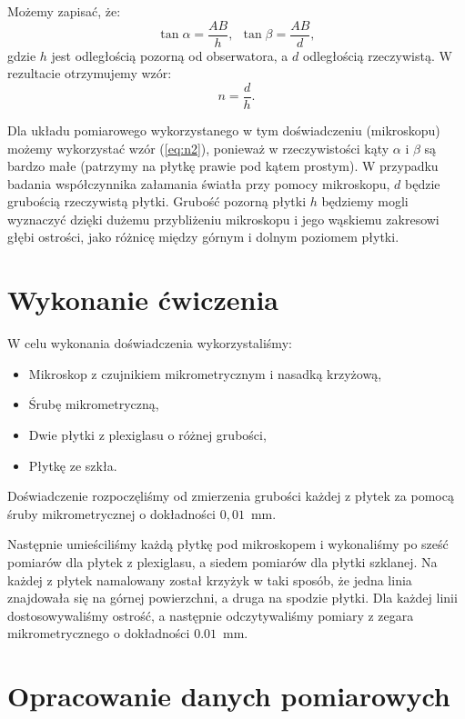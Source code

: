 \documentclass[12pt,a4paper]{article}
\numberwithin{equation}{section}
\begin{document}
Możemy zapisać, że:
\begin{equation}
	\tan \alpha = \frac{AB}{h},~~\tan \beta = \frac{AB}{d},
\end{equation}
gdzie $h$ jest odległością pozorną od obserwatora, a $d$ odległością rzeczywistą. W rezultacie otrzymujemy wzór:
\begin{equation}
	n = \frac{d}{h}.
	\label{eq:n2}
\end{equation}

Dla układu pomiarowego wykorzystanego w tym doświadczeniu (mikroskopu) możemy wykorzystać wzór (\ref{eq:n2}), ponieważ w rzeczywistości kąty $\alpha$ i $\beta$ są bardzo małe (patrzymy na płytkę prawie pod kątem prostym). W przypadku badania współczynnika załamania światła przy pomocy mikroskopu, $d$ będzie grubością rzeczywistą płytki. Grubość pozorną płytki $h$ będziemy mogli wyznaczyć dzięki dużemu przybliżeniu mikroskopu i jego wąskiemu zakresowi głębi ostrości, jako różnicę między górnym i dolnym poziomem płytki.

\section{Wykonanie ćwiczenia}
\label{sec:2}

W celu wykonania doświadczenia wykorzystaliśmy:
\begin{itemize}
	\item Mikroskop z czujnikiem mikrometrycznym i nasadką krzyżową,
	\item Śrubę mikrometryczną,
	\item Dwie płytki z plexiglasu o różnej grubości,
	\item Płytkę ze szkła.
\end{itemize}

Doświadczenie rozpoczęliśmy od zmierzenia grubości każdej z płytek za pomocą śruby mikrometrycznej o dokładności $0,01$~mm.

Następnie umieściliśmy każdą płytkę pod mikroskopem i wykonaliśmy po sześć pomiarów dla płytek z plexiglasu, a siedem pomiarów dla płytki szklanej. Na każdej z płytek namalowany został krzyżyk w taki sposób, że jedna linia znajdowała się na górnej powierzchni, a druga na spodzie płytki. Dla każdej linii dostosowywaliśmy ostrość, a następnie odczytywaliśmy pomiary z zegara mikrometrycznego o dokładności $0.01$~mm.

\pagebreak
\section{Opracowanie danych pomiarowych}
\end{document}

